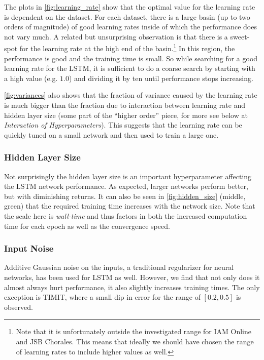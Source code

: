 The plots in \autoref{fig:learning_rate}  show that the optimal value for the learning rate is dependent on the dataset. For each dataset, there is a large basin (up to two orders of magnitude) of good learning rates inside of which the performance does not vary much. A related but unsurprising observation is that there is a sweet-spot for the learning rate at the high end of the basin.\footnote{Note that it is unfortunately outside the investigated range for IAM Online and JSB Chorales. This means that ideally we should have chosen the range of learning rates to include higher values as well.} In this region, the performance is good and the training time is small. So while searching for a good learning rate for the LSTM, it is sufficient to do a coarse search by starting with a high value (e.g. $1.0$) and dividing it by ten until performance stops increasing.

\autoref{fig:variances} also shows that the fraction of variance caused by the learning rate is much bigger than the fraction due to interaction between learning rate and hidden layer size (some part of the ``higher order'' piece, for more see below at \textit{Interaction of Hyperparameters}). This suggests that the learning rate can be quickly tuned on a small network and then used to train a large one.

\subsubsection*{Hidden Layer Size} Not surprisingly the hidden layer size is an important hyperparameter affecting the LSTM network performance. As expected, larger networks perform better, but with diminishing returns. It can also be seen in \autoref{fig:hidden_size} (middle, green) that the required training time increases with the network size. Note that the scale here is \emph{wall-time} and thus factors in both the increased computation time for each epoch as well as the convergence speed. 

\subsubsection*{Input Noise} Additive Gaussian noise on the inputs, a traditional regularizer for neural networks, has been used for LSTM as well. However, we find that not only does it almost always hurt performance, it also slightly increases training times. The only exception is TIMIT, where a small dip in error for the range of $[0.2, 0.5]$ is observed. 

